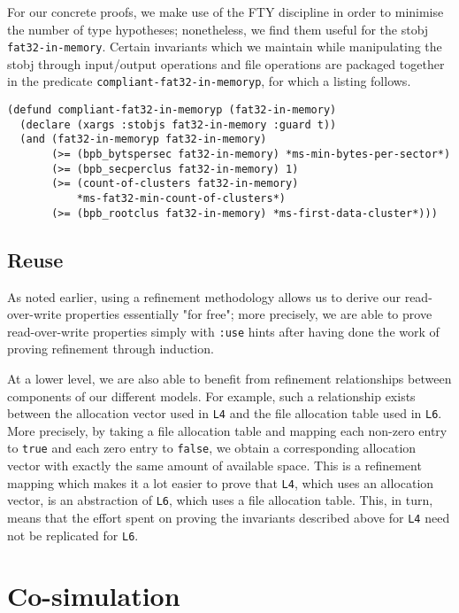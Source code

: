 \documentclass[submission,copyright,creativecommons]{eptcs}
\begin{document}
For our concrete proofs, we make use of the FTY discipline in order to
minimise the number of type hypotheses; nonetheless, we find them
useful for the stobj \texttt{fat32-in-memory}. Certain invariants
which we maintain while manipulating the stobj through input/output
operations and file operations are packaged together in the predicate
\texttt{compliant-fat32-in-memoryp}, for which a listing follows.

\medskip

\noindent
\begin{verbatim}
(defund compliant-fat32-in-memoryp (fat32-in-memory)
  (declare (xargs :stobjs fat32-in-memory :guard t))
  (and (fat32-in-memoryp fat32-in-memory)
       (>= (bpb_bytspersec fat32-in-memory) *ms-min-bytes-per-sector*)
       (>= (bpb_secperclus fat32-in-memory) 1)
       (>= (count-of-clusters fat32-in-memory)
           *ms-fat32-min-count-of-clusters*)
       (>= (bpb_rootclus fat32-in-memory) *ms-first-data-cluster*)))
\end{verbatim}

\subsection{Reuse}

As noted earlier, using a refinement methodology allows us to derive
our read-over-write properties essentially "for free"; more precisely,
we are able to prove read-over-write properties simply with
\texttt{:use} hints after having done the work of proving refinement
through induction.

At a lower level, we are also able to benefit from refinement
relationships between components of our different models. For example,
such a relationship exists between the allocation vector used in
\texttt{L4} and the file allocation table used in \texttt{L6}. More
precisely, by taking a file allocation table and mapping each non-zero
entry to \texttt{true} and each zero entry to \texttt{false}, we
obtain a corresponding allocation vector with exactly the same amount
of available space. This is a refinement mapping which makes it a lot
easier to prove that \texttt{L4}, which uses an allocation vector, is
an abstraction of \texttt{L6}, which uses a file allocation
table. This, in turn, means that the effort spent on proving the
invariants described above for \texttt{L4} need not be replicated for
\texttt{L6}.

\section{Co-simulation}
\end{document}

